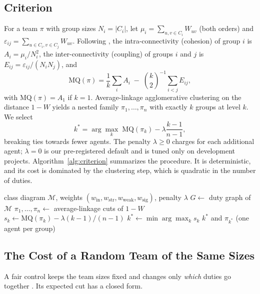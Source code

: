 \subsection{Criterion}
For a team $\pi$ with group sizes $N_i = |C_i|$, let $\mu_i = \sum_{u,v \in C_i} W_{uv}$ (both orders) and $\varepsilon_{ij} = \sum_{u \in C_i, v \in C_j} W_{uv}$. Following \citet{mancoridis1998bunch}, the intra-connectivity (cohesion) of group $i$ is $A_i = \mu_i / N_i^2$, the inter-connectivity (coupling) of groups $i$ and $j$ is $E_{ij} = \varepsilon_{ij} / (N_i N_j)$, and
\begin{equation}
\mathrm{MQ}(\pi) = \frac{1}{k}\sum_{i} A_i \;-\; \binom{k}{2}^{-1}\!\sum_{i<j} E_{ij},
\label{eq:mq}
\end{equation}
with $\mathrm{MQ}(\pi) = A_1$ if $k = 1$. Average-linkage agglomerative clustering on the distance $1 - W$ yields a nested family $\pi_1, \dots, \pi_n$ with exactly $k$ groups at level $k$. We select
\begin{equation}
k^\ast = \arg\max_{k} \; \mathrm{MQ}(\pi_k) - \lambda \frac{k-1}{n-1},
\label{eq:kstar}
\end{equation}
breaking ties towards fewer agents. The penalty $\lambda \ge 0$ charges for each additional agent; $\lambda = 0$ is our pre-registered default and is tuned only on development projects. Algorithm~\ref{alg:criterion} summarizes the procedure. It is deterministic, and its cost is dominated by the clustering step, which is quadratic in the number of duties.

\begin{algorithm}[t]
\caption{Design-time team sizing}
\label{alg:criterion}
\begin{algorithmic}[1]
\Require class diagram $\mathcal{M}$, weights $(w_{\text{in}}, w_{\text{str}}, w_{\text{weak}}, w_{\text{sig}})$, penalty $\lambda$
\State $G \gets$ duty graph of $\mathcal{M}$ 
\State $\pi_1,\dots,\pi_n \gets$ average-linkage cuts of $1 - W$
 \State $s_k \gets \mathrm{MQ}(\pi_k) - \lambda (k-1)/(n-1)$ \EndFor
\State $k^\ast \gets \min \arg\max_k s_k$
\State \Return $k^\ast$ and $\pi_{k^\ast}$ (one agent per group)
\end{algorithmic}
\end{algorithm}

\subsection{The Cost of a Random Team of the Same Sizes}
A fair control keeps the team sizes fixed and changes only \emph{which} duties go together \citep{zhang2026rethinking}. Its expected cut has a closed form.

